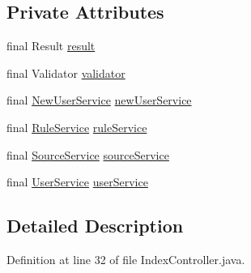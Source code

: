 \subsection*{Private Attributes}
\begin{DoxyCompactItemize}
\item 
final Result \hyperlink{classbr_1_1usp_1_1cata_1_1web_1_1controller_1_1_index_controller_ace414d68bfba9031fb373f7b4baa0fd2}{result}
\item 
final Validator \hyperlink{classbr_1_1usp_1_1cata_1_1web_1_1controller_1_1_index_controller_aeff3144091a7190b11bce384268d3dff}{validator}
\item 
final \hyperlink{classbr_1_1usp_1_1cata_1_1service_1_1_new_user_service}{New\+User\+Service} \hyperlink{classbr_1_1usp_1_1cata_1_1web_1_1controller_1_1_index_controller_a89da9591484e01e980859f311d6f2cb5}{new\+User\+Service}
\item 
final \hyperlink{classbr_1_1usp_1_1cata_1_1service_1_1_rule_service}{Rule\+Service} \hyperlink{classbr_1_1usp_1_1cata_1_1web_1_1controller_1_1_index_controller_a4f6fce52bf3206bc01fea51436892c66}{rule\+Service}
\item 
final \hyperlink{classbr_1_1usp_1_1cata_1_1service_1_1_source_service}{Source\+Service} \hyperlink{classbr_1_1usp_1_1cata_1_1web_1_1controller_1_1_index_controller_aa8494d0f32eb44ed68bb0628b8295e14}{source\+Service}
\item 
final \hyperlink{classbr_1_1usp_1_1cata_1_1service_1_1_user_service}{User\+Service} \hyperlink{classbr_1_1usp_1_1cata_1_1web_1_1controller_1_1_index_controller_aae8b09d6f60a8edd3995685b8f1cd86c}{user\+Service}
\end{DoxyCompactItemize}


\subsection{Detailed Description}


Definition at line 32 of file Index\+Controller.\+java.



